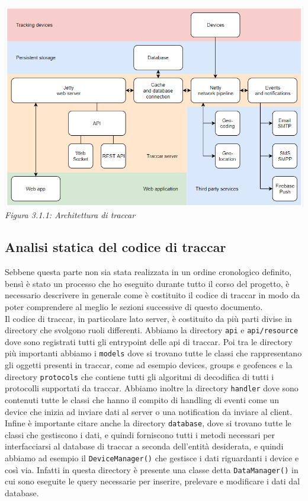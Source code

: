 \documentclass[a4paper,titlepage,12pt]{book}
\begin{document}
{\begin{center}
\includegraphics[scale=0.7]{images/arcTraccar.png} \\
\textit{Figura 3.1.1: Architettura di traccar}
\end{center}

\subsection{
Analisi statica del codice di traccar}
Sebbene questa parte non sia stata realizzata in un ordine cronologico definito, bensì è stato un processo che ho eseguito durante tutto il corso del progetto, è necessario descrivere in generale come è costituito il codice di traccar in modo da poter comprendere al meglio le sezioni successive di questo documento.\\
Il codice di traccar, in particolare lato server, è costituito da più parti divise in directory che svolgono ruoli differenti. Abbiamo la directory \texttt{api} e \texttt{api/resource} dove sono registrati tutti gli entrypoint delle api di traccar. Poi tra le directory più importanti abbiamo i \texttt{models} dove si trovano tutte le classi che rappresentano gli oggetti presenti in traccar, come ad esempio devices, groups e geofences e la directory \texttt{protocols} che contiene tutti gli algoritmi di decodifica di tutti i protocolli supportati da traccar. Abbiamo inoltre la directory \texttt{handler} dove sono contenuti tutte le classi che hanno il compito di handling di eventi come un device che inizia ad inviare dati al server o una notification da inviare al client. Infine è importante citare anche la directory \texttt{database}, dove si trovano tutte le classi che gestiscono i dati, e quindi forniscono tutti i metodi necessari per interfacciarsi al database di traccar a seconda dell'entità desiderata, e quindi abbiamo ad esempio il \texttt{DeviceManager()} che gestisce i dati riguardanti i device e così via. Infatti in questa directory è presente una classe detta \texttt{DataManager()} in cui sono eseguite le query necessarie per inserire, prelevare e modificare i dati dal database.


}
\end{document}
